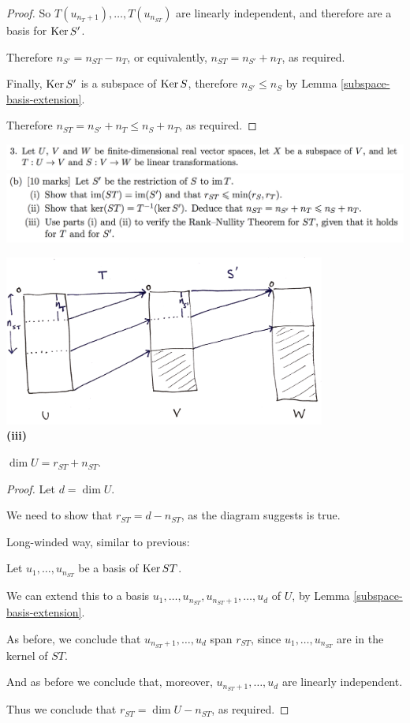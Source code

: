 \documentclass[12pt]{article}
\begin{document}
\begin{proof}
  So $T(u_{n_T + 1}), \ldots, T(u_{n_{ST}})$ are linearly independent, and
  therefore are a basis for $\operatorname{\mathrm{Ker}} S'$.

  Therefore $n_{S'} = n_{ST} - n_T$, or equivalently, $n_{ST} = n_{S'} + n_T$,
  as required.

  Finally, $\operatorname{\mathrm{Ker}} S'$ is a subspace of $\operatorname{\mathrm{Ker}} S$, therefore $n_{S'} \leq n_S$ by
  Lemma \ref{subspace-basis-extension}.

  Therefore $n_{ST} = n_{S'} + n_T \leq n_S + n_T$, as required.
\end{proof}

\newpage
\begin{mdframed}
\includegraphics[width=400pt]{img/oxford-prelims-2017-A-3-0.png}\\
\includegraphics[width=400pt]{img/oxford-prelims-2017-A-3-2.png}
\end{mdframed}
\includegraphics[width=300pt]{img/oxford-prelims-2017-A-3-diagram.png}\\
\textbf{(iii)}

\begin{claim*}
  $\dim U = r_{ST} + n_{ST}$.
\end{claim*}

\begin{proof}
  Let $d = \dim U$.

  We need to show that $r_{ST} = d - n_{ST}$, as the diagram suggests is true.

  Long-winded way, similar to previous:

  Let $u_1, \ldots, u_{n_{ST}}$ be a basis of $\operatorname{\mathrm{Ker}} ST$.

  We can extend this to a basis
  $u_1, \ldots, u_{n_{ST}}, u_{n_{ST} + 1}, \ldots, u_d$ of $U$, by Lemma
  \ref{subspace-basis-extension}.

  As before, we conclude that $u_{n_{ST} + 1}, \ldots, u_d$ span $r_{ST}$,
  since $u_1, \ldots, u_{n_{ST}}$ are in the kernel of $ST$.

  And as before we conclude that, moreover, $u_{n_{ST} + 1}, \ldots, u_d$ are
  linearly independent.

  Thus we conclude that $r_{ST} = \dim U - n_{ST}$, as required.
\end{proof}
\end{document}
